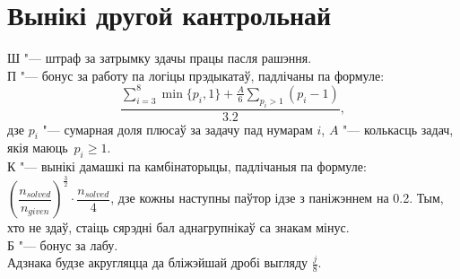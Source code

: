 \documentclass[12pt, a4paper]{extarticle}
\begin{document}
    \section{Вынікі другой кантрольнай}
    \noindent Ш "--- штраф за затрымку здачы працы пасля рашэння. \\
    П "--- бонус за работу па логіцы прэдыкатаў, падлічаны па формуле:
    $$\dfrac{\sum \limits _{i=3} ^8 \min\{p_i, 1\} + \frac{A}{6} \sum \limits _{p_i > 1} (p_i - 1)}{3.2},$$
    дзе $p_i$ "--- сумарная доля плюсаў за задачу пад нумарам $i$, $A$ "--- колькасць задач, якія маюць~$p_i \geqslant 1$. \\
    К "--- вынікі дамашкі па камбінаторыцы, падлічаныя  па формуле: $\left(\dfrac{n_{solved}}{n_{given}}\right) ^{\frac{3}{2}} \cdot \dfrac{n_{solved}}{4}$, дзе кожны наступны паўтор ідзе з паніжэннем на 0.2.
    Тым, хто не здаў, стаіць сярэдні бал аднагрупнікаў са знакам мінус.\\
    Б "--- бонус за лабу. \\
    Адзнака будзе акругляцца да бліжэйшай дробі выгляду $\frac{j}{8}$.
\end{document}
